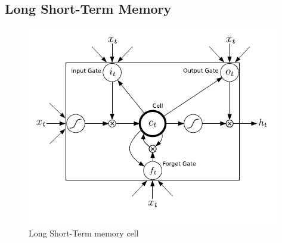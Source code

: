 \subsection*{Long Short-Term Memory}
    \begin{figure}[H]
        \centering
        \includegraphics[width=0.7\linewidth]{../images/Graves13-fig2-lstm_arch.png}
        \caption{Long Short-Term memory cell \cite{DBLP:journals/corr/Graves13}} \label{fig:lstm}
    \end{figure}
